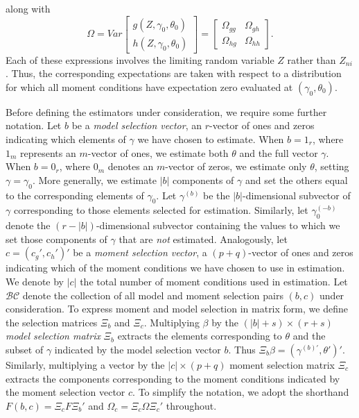 along with 
	\begin{equation}
		\Omega = Var\left[ \begin{array}{c} g(Z, \gamma_0, \theta_0) \\ h(Z, \gamma_0, \theta_0) \end{array}\right] =\left[ \begin{array}{cc}\Omega_{gg} & \Omega_{gh}\\ \Omega_{hg}& \Omega_{hh} \end{array} \right].
	\end{equation}
Each of these expressions involves the limiting random variable $Z$ rather than $Z_{ni}$. 
Thus, the corresponding expectations are taken with respect to a distribution for which all moment conditions have expectation zero  evaluated at $(\gamma_0,\theta_0)$.

Before defining the estimators under consideration, we require some further notation. Let $b$ be a \emph{model selection vector}, an $r$-vector of ones and zeros indicating which elements of $\gamma$ we have chosen to estimate. 
When $b = 1_r$, where $1_m$ represents an $m$-vector of ones, we estimate both $\theta$ and the full vector $\gamma$. 
When $b = 0_r$, where $0_m$ denotes an $m$-vector of zeros, we estimate only $\theta$, setting $\gamma=\gamma_0$. 
More generally, we estimate $|b|$ components of $\gamma$ and set the others equal to the corresponding elements of $\gamma_0$. 
Let $\gamma^{(b)}$ be the $|b|$-dimensional subvector of $\gamma$ corresponding to those elements selected for estimation. 
Similarly, let $\gamma^{(-b)}_0$ denote the $(r-|b|)$-dimensional subvector containing the values to which we set those components of $\gamma$ that are \emph{not} estimated.
Analogously, let $c=\left(c_g', c_h'\right)'$ be a \emph{moment selection vector}, a $(p+q)$-vector of ones and zeros indicating which of the moment conditions we have chosen to use in estimation. 
We denote by $|c|$ the total number of moment conditions used in estimation. 
Let $\mathcal{BC}$ denote the collection of all model and moment selection pairs $(b,c)$ under consideration.
To express moment and model selection in matrix form, we define the selection matrices $\Xi_b$ and $\Xi_c$.
Multiplying $\beta$ by the $(|b| + s)\times(r+s)$ \emph{model selection matrix} $\Xi_b$ extracts the elements corresponding to $\theta$ and the subset of $\gamma$ indicated by the model selection vector $b$. 
Thus $\Xi_b \beta = \left(\gamma^{(b)'}, \theta' \right)'$.
Similarly, multiplying a vector by the $|c|\times(p+q)$ moment selection matrix $\Xi_c$ extracts the components corresponding to the moment conditions indicated by the moment selection vector $c$. 
To simplify the notation, we adopt the shorthand $F(b,c) = \Xi_c F \Xi_b'$ and $\Omega_c = \Xi_c \Omega \Xi_c'$ throughout.


